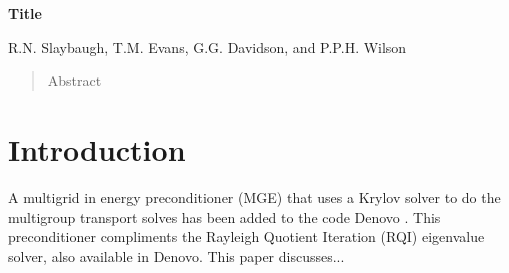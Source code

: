 \documentclass[preprint,12pt]{elsarticle}
\begin{document}
\setcounter{page}{2}
  

\begin{center}

  {\large \bf Title}
  
  \vspace{0.3in}
  
  R.N. Slaybaugh, T.M. Evans, G.G. Davidson, and P.P.H. Wilson
  
\end{center}

\doublespacing

\vspace{0.3in}

\begin{abstract}

  Abstract

\end{abstract}

\newpage


\section{Introduction}
\label{sec:intro}

A multigrid in energy preconditioner (MGE) that uses a Krylov solver to do the multigroup transport solves has been added to the code Denovo \cite{Evans2010}. This preconditioner compliments the Rayleigh Quotient Iteration (RQI) eigenvalue solver, also available in Denovo. This paper discusses...

\end{document}
